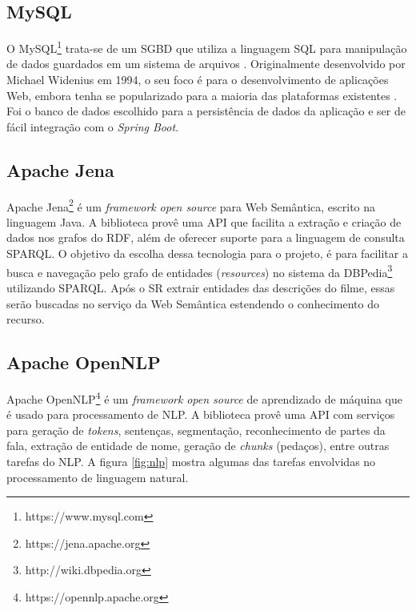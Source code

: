 \subsection{MySQL}

O MySQL\footnote{https://www.mysql.com} trata-se de um \ac{SGBD} que utiliza a linguagem \ac{SQL} para manipulação de dados guardados em um sistema de arquivos \citep{MySQLSGBD}. Originalmente desenvolvido por Michael Widenius em 1994, o seu foco é para o desenvolvimento de aplicações Web, embora tenha se popularizado para a maioria das plataformas existentes \citep{MySQLDevelopers}. Foi o banco de dados escolhido para a persistência de dados da aplicação e ser de fácil integração com o \textit{Spring Boot}.

\subsection{Apache Jena}

Apache Jena\footnote{https://jena.apache.org} é um \textit{framework} \textit{open source} para Web Semântica, escrito na linguagem Java. A biblioteca provê uma \ac{API} que facilita a extração e criação de dados nos grafos  do \ac{RDF}, além de oferecer suporte para a linguagem de consulta \ac{SPARQL}. O objetivo da escolha dessa tecnologia para o projeto, é para facilitar a busca e navegação pelo grafo de entidades (\textit{resources}) no sistema da DBPedia\footnote{http://wiki.dbpedia.org} utilizando \ac{SPARQL}. Após o \ac{SR} extrair entidades das descrições do filme, essas serão buscadas no serviço da Web Semântica estendendo o conhecimento do recurso.

\subsection{Apache OpenNLP}

Apache OpenNLP\footnote{https://opennlp.apache.org} é um \textit{framework} \textit{open source} de aprendizado de máquina que é usado para processamento de \ac{NLP}. A biblioteca provê uma \ac{API} com serviços para geração de \textit{tokens}, sentenças, segmentação, reconhecimento de partes da fala, extração de entidade de nome, geração de \textit{chunks} (pedaços), entre outras tarefas do \ac{NLP}. A figura \ref{fig:nlp} mostra algumas das tarefas envolvidas no processamento de linguagem natural.

